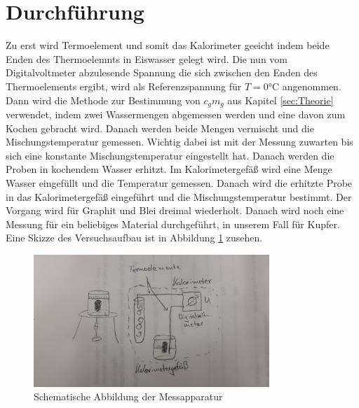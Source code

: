 \section{Durchführung}
\label{sec:Durchführung}
Zu erst wird Termoelement und somit das Kalorimeter geeicht indem
beide Enden des Thermoelemnts in Eiswasser gelegt wird. Die nun vom Digitalvoltmeter
abzulesende Spannung die sich zwischen den Enden des Thermoelements ergibt, wird
als Referenzspannung für $T = 0 \si{\celsius}$ angenommen.
Dann wird die Methode zur Bestimmung von $c_gm_g$ aus Kapitel \ref{sec:Theorie}
verwendet, indem zwei Wassermengen abgemessen werden und eine davon zum Kochen
gebracht wird. Danach werden beide Mengen vermischt und die Mischungstemperatur
gemessen. Wichtig dabei ist mit der Messung zuwarten bis sich eine konstante
Mischungstemperatur eingestellt hat. Danach werden die Proben in kochendem
Wasser erhitzt. Im Kalorimetergefäß wird eine Menge Wasser eingefüllt und die
Temperatur gemessen. Danach wird die erhitzte Probe in das Kalorimetergefäß
eingeführt und die Mischungstemperatur bestimmt.
Der Vorgang wird für Graphit und Blei dreimal wiederholt.  Danach wird noch eine
Messung für ein beliebiges Material durchgeführt, in unserem Fall für Kupfer.
Eine Skizze des Versuchsaufbau ist in Abbildung \ref{fig:skizze} zusehen.

\begin{figure}
  \centering
  \includegraphics[height=5cm]{logos/skizze.jpg}
  \caption{Schematische Abbildung der Messapparatur \cite{Anleitung}}
  \label{fig:skizze}
\end{figure}

